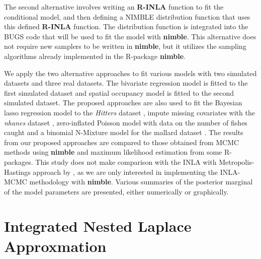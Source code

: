 \documentclass[
]{article}
\begin{document}
The second alternative involves writing an \textbf{R-INLA} function to
fit the conditional model, and then defining a NIMBLE distribution
function that uses this defined \textbf{R-INLA} function. The
distribution function is integrated into the BUGS code that will be used
to fit the model with \textbf{nimble}. This alternative does not require
new samplers to be written in \textbf{nimble}, but it utilizes the
sampling algorithms already implemented in the R-package
\textbf{nimble}.

We apply the two alternative approaches to fit various models with two
simulated datasets and three real datasets. The bivariate regression
model is fitted to the first simulated dataset and spatial occupancy
model is fitted to the second simulated dataset. The proposed approaches
are also used to fit the Bayesian lasso regression model to the
\textit{Hitters} dataset \citep{gareth2013introduction}, impute missing
covariates with the \textit{nhanes} dataset
\citep[accessed from ][]{van2011mice}, zero-inflated Poisson model with
data on the number of fishes caught
\citep[data retrieved from ][]{berild2022importance} and a binomial
N-Mixture model for the mallard dataset
\citep[accessed from R-package \textbf{unmarked}][]{unmarked}. The
results from our proposed approaches are compared to those obtained from
MCMC methods using \textbf{nimble} and maximum likelihood estimation
from some R-packages. This study does not make comparison with the INLA
with Metropolis-Hastings approach by \cite{gomez2018markov}, as we are
only interested in implementing the INLA-MCMC methodology with
\textbf{nimble}. Various summaries of the posterior marginal of the
model parameters are presented, either numerically or graphically.

\hypertarget{integrated-nested-laplace-approxmation}{%
\section{Integrated Nested Laplace
Approxmation}\label{integrated-nested-laplace-approxmation}}
\end{document}
